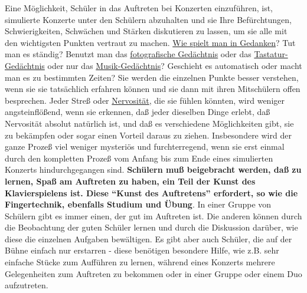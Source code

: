 Eine Möglichkeit, Schüler in das Auftreten bei Konzerten einzuführen, ist, simulierte Konzerte unter den Schülern abzuhalten und sie Ihre Befürchtungen, Schwierigkeiten, Schwächen und Stärken diskutieren zu lassen, um sie alle mit den wichtigsten Punkten vertraut zu machen.
\hyperlink{c1ii12mental}{Wie spielt man in Gedanken}?
Tut man es ständig?
Benutzt man das \hyperlink{c1iii6foto}{fotografische Gedächtnis} oder das \hyperlink{c1iii6tastatur}{Tastatur-Gedächtnis} oder nur das \hyperlink{c1iii6musik}{Musik-Gedächtnis}?
Geschieht es automatisch oder macht man es zu bestimmten Zeiten?
Sie werden die einzelnen Punkte besser verstehen, wenn sie sie tatsächlich erfahren können und sie dann mit ihren Mitschülern offen besprechen.
Jeder Streß oder \hyperlink{c1iii15}{Nervosität}, die sie fühlen könnten, wird weniger angsteinflößend, wenn sie erkennen, daß jeder dieselben Dinge erlebt, daß Nervosität absolut natürlich ist, und daß es verschiedene Möglichkeiten gibt, sie zu bekämpfen oder sogar einen Vorteil daraus zu ziehen.
Insbesondere wird der ganze Prozeß viel weniger mysteriös und furchterregend, wenn sie erst einmal durch den kompletten Prozeß vom Anfang bis zum Ende eines simulierten Konzerts hindurchgegangen sind.
\textbf{Schülern muß beigebracht werden, daß zu lernen, Spaß am Auftreten zu haben, ein Teil der Kunst des Klavierspielens ist.
Diese \enquote{Kunst des Auftretens} erfordert, so wie die Fingertechnik, ebenfalls Studium und Übung}.
In einer Gruppe von Schülern gibt es immer einen, der gut im Auftreten ist.
Die anderen können durch die Beobachtung der guten Schüler lernen und durch die Diskussion darüber, wie diese die einzelnen Aufgaben bewältigen.
Es gibt aber auch Schüler, die auf der Bühne einfach nur erstarren - diese benötigen besondere Hilfe, wie z.B. sehr einfache Stücke zum Aufführen zu lernen, während eines Konzerts mehrere Gelegenheiten zum Auftreten zu bekommen oder in einer Gruppe oder einem Duo aufzutreten.

